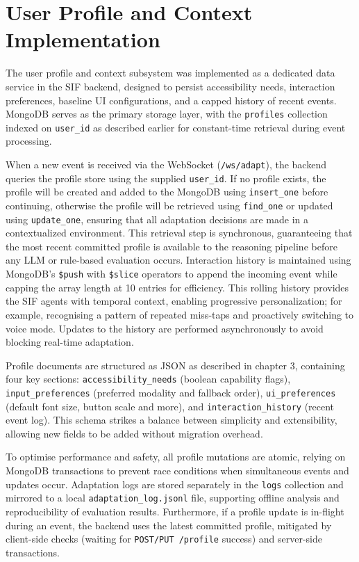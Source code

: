 \documentclass[openany]{book}
\begin{document}
\section{User Profile and Context Implementation}
The user profile and context subsystem was implemented as a dedicated data service in the SIF backend, designed to persist accessibility needs, interaction preferences, baseline UI configurations, and a capped history of recent events. MongoDB serves as the primary storage layer, with the \texttt{profiles} collection indexed on \texttt{user\_id} as described earlier for constant-time retrieval during event processing.

When a new event is received via the WebSocket (\texttt{/ws/adapt}), the backend queries the profile store using the supplied \texttt{user\_id}. If no profile exists, the profile will be created and added to the MongoDB using \texttt{insert\_one} before continuing, otherwise the profile will be retrieved using \texttt{find\_one} or updated using \texttt{update\_one}, ensuring that all adaptation decisions are made in a contextualized environment. This retrieval step is synchronous, guaranteeing that the most recent committed profile is available to the reasoning pipeline before any LLM or rule-based evaluation occurs. Interaction history is maintained using MongoDB’s \texttt{\$push} with \texttt{\$slice} operators to append the incoming event while capping the array length at 10 entries for efficiency. This rolling history provides the SIF agents with temporal context, enabling progressive personalization; for example, recognising a pattern of repeated miss-taps and proactively switching to voice mode. Updates to the history are performed asynchronously to avoid blocking real-time adaptation.

Profile documents are structured as JSON as described in chapter 3, containing four key sections: \texttt{accessibility\_needs} (boolean capability flags), \texttt{input\_preferences} (preferred modality and fallback order), \texttt{ui\_preferences} (default font size, button scale and more), and \texttt{interaction\_history} (recent event log). This schema strikes a balance between simplicity and extensibility, allowing new fields to be added without migration overhead.

To optimise performance and safety, all profile mutations are atomic, relying on MongoDB transactions to prevent race conditions when simultaneous events and updates occur. Adaptation logs are stored separately in the \texttt{logs} collection and mirrored to a local \texttt{adaptation\_log.jsonl} file, supporting offline analysis and reproducibility of evaluation results. Furthermore, if a profile update is in-flight during an event, the backend uses the latest committed profile, mitigated by client-side checks (waiting for \texttt{POST/PUT /profile} success) and server-side transactions.
\end{document}
